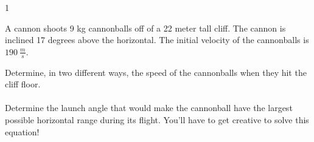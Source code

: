 
\AddToShipoutPicture*{\BackgroundPic}

\addtocounter {ProbNum} {1}

 
{\bf \Large{}} A cannon shoots 9 kg cannonballs off of a 22 meter tall cliff.  The cannon is inclined 17 degrees above the horizontal.  The initial velocity of the cannonballs is ${190~\tfrac{m}{s}}$.

\bigskip
Determine, in two different ways, the speed of the cannonballs when they hit the cliff floor.\paragraph{}
\noindent
\vfill
\vfill

Determine the launch angle that would make the cannonball have the largest possible horizontal range during its flight. You'll have to get creative to solve this equation!
\vfill
\newpage
